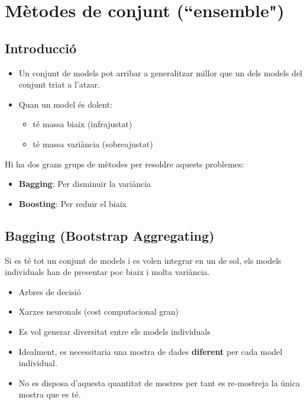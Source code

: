 \chapter{Mètodes de conjunt (``ensemble")}
\section{Introducció}

\begin{itemize}
	\item Un conjunt de models pot arribar a generalitzar millor que un dels models del conjunt triat a l'atzar.
	\item Quan un model és dolent:
	\begin{itemize}
		\item té massa biaix (infrajustat)
		\item té massa variància (sobreajustat)
	\end{itemize}
\end{itemize}

Hi ha dos grans grups de mètodes per resoldre aquests problemes:
\begin{itemize}
	\item \textbf{Bagging}: Per disminuir la variància
	\item \textbf{Boosting}: Per reduir el biaix
\end{itemize}

\section{Bagging (Bootstrap Aggregating)}
Si es té tot un conjunt de models i es volen integrar en un de sol, els models individuals han de presentar poc biaix i molta variància. 

\begin{itemize}
	\item Arbres de decisió
	\item Xarxes neuronals (cost computacional gran)
\end{itemize}

\begin{itemize}
	\item Es vol generar diversitat entre els models individuals
	\item Idealment, es necessitaria una mostra de dades \textbf{diferent} per cada model individual.
	\item No es disposa d'aquesta quantitat de mostres per tant es re-mostreja la única mostra que es té.
\end{itemize}


